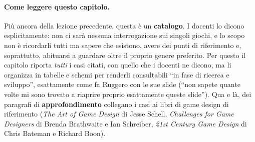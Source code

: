 \paragraph{Come leggere questo capitolo.} Più ancora della lezione precedente,
questa è un \textbf{catalogo}. I docenti lo dicono esplicitamente: non ci sarà
nessuna interrogazione sui singoli giochi, e lo scopo non è ricordarli tutti ma
sapere che esistono, avere dei punti di riferimento e, soprattutto, abituarsi a
guardare oltre il proprio genere preferito. Per questo il capitolo riporta
\emph{tutti} i casi citati, con quello che i docenti ne dicono, ma li organizza
in tabelle e schemi per renderli consultabili ``in fase di ricerca e sviluppo'',
esattamente come fa Ruggero con le sue slide (``non sapete quante volte mi sono
trovato a riaprire proprio esattamente queste slide''). Qua e là, dei paragrafi
di \textbf{approfondimento} collegano i casi ai libri di game design di
riferimento (\emph{The Art of Game Design} di Jesse Schell, \emph{Challenges for
Game Designers} di Brenda Brathwaite e Ian Schreiber, \emph{21st Century Game
Design} di Chris Bateman e Richard Boon).

